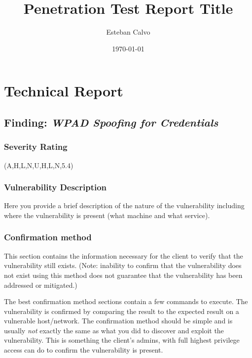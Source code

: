 \documentclass[notitlepage]{article}
\begin{document}
  
\title{Penetration Test Report Title}
\author{Esteban Calvo}
\date{\isodate\today}

\maketitle

\tableofcontents

\newpage

\section{Technical Report}

  \subsection{Finding: \emph{WPAD Spoofing for Credentials}}
  
	\subsubsection*{Severity Rating}
		\cvss(A,H,L,N,U,H,L,N,5.4)
		
  	\subsubsection*{Vulnerability Description}
  		Here you provide a brief description of the nature of the vulnerability
  		including where the vulnerability is present (what machine and
  		what service).
  		
  	\subsubsection*{Confirmation method}
  	
		This section contains the information necessary for the
		client to verify that the vulnerability still exists.
		(Note: inability to confirm that the vulnerability
		does not exist using this method does not
		guarantee that the vulnerability has been addressed
		or mitigated.)
		
		The best confirmation method sections contain a few commands
		to execute. The vulnerability is confirmed by comparing
		the result to the expected result on a vulnerable
		host/network. The confirmation method should be simple
		and is usually \emph{not} exactly the same as what you
		did to discover and exploit the vulnerability.
		This is something the client's admins, with full
		highest privilege access can do to confirm the
		vulnerability is present.
		
\end{document}
